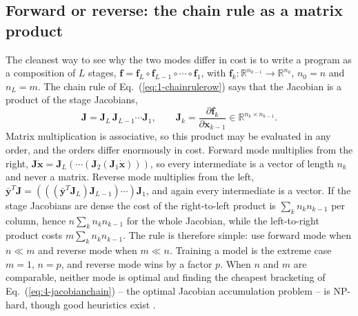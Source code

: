 \subsection{Forward or reverse: the chain rule as a matrix product}
\label{sec:adorder}

The cleanest way to see why the two modes differ in cost is to write a program
as a composition of $L$ stages,
$\bm{f}=\bm{f}_L\circ\bm{f}_{L-1}\circ\cdots\circ\bm{f}_1$, with
$\bm{f}_k:\mathbb{R}^{n_{k-1}}\to\mathbb{R}^{n_k}$, $n_0=n$ and $n_L=m$.  The
chain rule of Eq.~(\ref{eq:1-chainrulerow}) says that the Jacobian is a
product of the stage Jacobians,
\begin{equation}
  \bm{J} = \bm{J}_L\,\bm{J}_{L-1}\cdots\bm{J}_1 ,
  \qquad
  \bm{J}_k = \frac{\partial\bm{f}_k}{\partial\bm{x}_{k-1}}\in\mathbb{R}^{n_k\times n_{k-1}} .
  \label{eq:4-jacobianchain}
\end{equation}
Matrix multiplication is associative, so this product may be evaluated in any
order, and the orders differ enormously in cost.  Forward mode multiplies from
the right, $\bm{J}\dot{\bm{x}}=\bm{J}_L(\cdots(\bm{J}_2(\bm{J}_1\dot{\bm{x}})))$,
so every intermediate is a vector of length $n_k$ and never a matrix.  Reverse
mode multiplies from the left, $\bar{\bm{y}}^{T}\bm{J}
=(((\bar{\bm{y}}^{T}\bm{J}_L)\bm{J}_{L-1})\cdots)\bm{J}_1$, and again every
intermediate is a vector.  If the stage Jacobians are dense the cost of the
right-to-left product is $\sum_k n_kn_{k-1}$ per column, hence
$n\sum_kn_kn_{k-1}$ for the whole Jacobian, while the left-to-right product
costs $m\sum_kn_kn_{k-1}$.  The rule is therefore simple: use forward mode
when $n\ll m$ and reverse mode when $m\ll n$.  Training a model is the
extreme case $m=1$, $n=p$, and reverse mode wins by a factor $p$.  When $n$
and $m$ are comparable, neither mode is optimal and finding the cheapest
bracketing of Eq.~(\ref{eq:4-jacobianchain}) -- the optimal Jacobian
accumulation problem -- is NP-hard, though good heuristics exist
\cite{griewank2008}.

